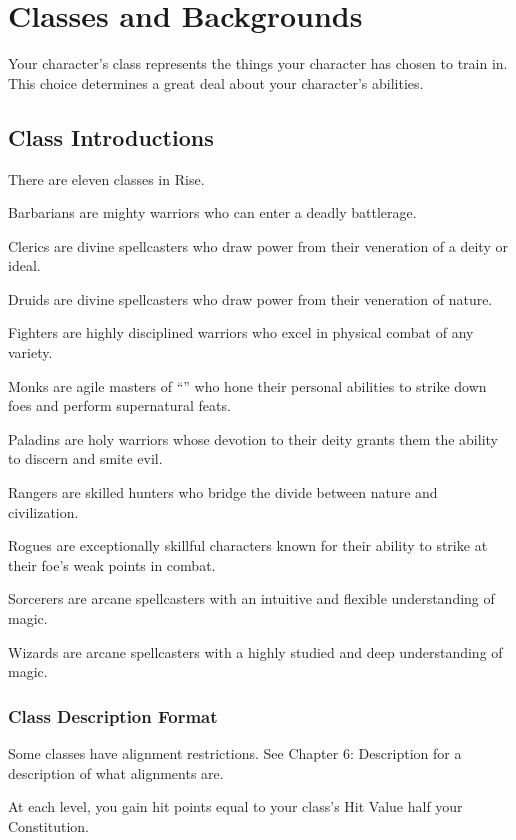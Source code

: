 \chapter{Classes and Backgrounds}
Your character's class represents the things your character has chosen to train in. This choice determines a great deal about your character's abilities.

\section{Class Introductions}
There are eleven classes in Rise.
\begin{itemize*}
  \item Barbarians are mighty warriors who can enter a deadly battlerage.
  \item Clerics are divine spellcasters who draw power from their veneration of a deity or ideal.
  \item Druids are divine spellcasters who draw power from their veneration of nature.
  \item Fighters are highly disciplined warriors who excel in physical combat of any variety.
  \item Monks are agile masters of ``\ki'' who hone their personal abilities to strike down foes and perform supernatural feats.
  \item Paladins are holy warriors whose devotion to their deity grants them the ability to discern and smite evil.
  \item Rangers are skilled hunters who bridge the divide between nature and civilization.
  \item Rogues are exceptionally skillful characters known for their ability to strike at their foe's weak points in combat.
  \item Sorcerers are arcane spellcasters with an intuitive and flexible understanding of magic.
  \item Wizards are arcane spellcasters with a highly studied and deep understanding of magic.
\end{itemize*}

\subsection{Class Description Format}

 Some classes have alignment restrictions. See Chapter 6: Description for a description of what alignments are.

 At each level, you gain hit points equal to your class's Hit Value \add half your Constitution.

